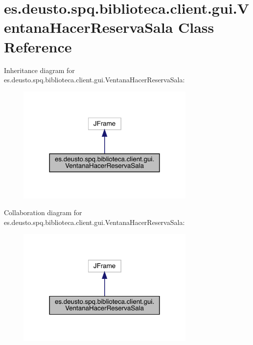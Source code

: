 \hypertarget{classes_1_1deusto_1_1spq_1_1biblioteca_1_1client_1_1gui_1_1_ventana_hacer_reserva_sala}{}\section{es.\+deusto.\+spq.\+biblioteca.\+client.\+gui.\+Ventana\+Hacer\+Reserva\+Sala Class Reference}
\label{classes_1_1deusto_1_1spq_1_1biblioteca_1_1client_1_1gui_1_1_ventana_hacer_reserva_sala}


Inheritance diagram for es.\+deusto.\+spq.\+biblioteca.\+client.\+gui.\+Ventana\+Hacer\+Reserva\+Sala\+:
\nopagebreak
\begin{figure}[H]
\begin{center}
\leavevmode
\includegraphics[width=248pt]{classes_1_1deusto_1_1spq_1_1biblioteca_1_1client_1_1gui_1_1_ventana_hacer_reserva_sala__inherit__graph}
\end{center}
\end{figure}


Collaboration diagram for es.\+deusto.\+spq.\+biblioteca.\+client.\+gui.\+Ventana\+Hacer\+Reserva\+Sala\+:
\nopagebreak
\begin{figure}[H]
\begin{center}
\leavevmode
\includegraphics[width=248pt]{classes_1_1deusto_1_1spq_1_1biblioteca_1_1client_1_1gui_1_1_ventana_hacer_reserva_sala__coll__graph}
\end{center}
\end{figure}
